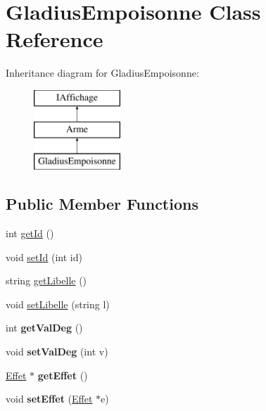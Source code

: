 \hypertarget{class_gladius_empoisonne}{\section{\-Gladius\-Empoisonne \-Class \-Reference}
\label{class_gladius_empoisonne}
}
\-Inheritance diagram for \-Gladius\-Empoisonne\-:\begin{figure}[H]
\begin{center}
\leavevmode
\includegraphics[height=3.000000cm]{class_gladius_empoisonne}
\end{center}
\end{figure}
\subsection*{\-Public \-Member \-Functions}
\begin{DoxyCompactItemize}
\item 
int \hyperlink{class_gladius_empoisonne_a23898d8572b5f9c552aec390cf474523}{get\-Id} ()
\item 
void \hyperlink{class_gladius_empoisonne_ac2dba19740e6b5e4c20bd2b783499682}{set\-Id} (int id)
\item 
string \hyperlink{class_gladius_empoisonne_a0db1471bda9bcd106c951ea5b1b9c7d5}{get\-Libelle} ()
\item 
void \hyperlink{class_gladius_empoisonne_af7260cdfc296aecb4433ccf9a5b18dc7}{set\-Libelle} (string l)
\item 
\hypertarget{class_gladius_empoisonne_abb1c37061e98b52d83d818c0a3c3065b}{int {\bfseries get\-Val\-Deg} ()}\label{class_gladius_empoisonne_abb1c37061e98b52d83d818c0a3c3065b}

\item 
\hypertarget{class_gladius_empoisonne_ab32eae0eafd4b365df10729b2a50367d}{void {\bfseries set\-Val\-Deg} (int v)}\label{class_gladius_empoisonne_ab32eae0eafd4b365df10729b2a50367d}

\item 
\hypertarget{class_gladius_empoisonne_af97519c3f19397455f0cf9eaa76b886d}{\hyperlink{class_effet}{\-Effet} $\ast$ {\bfseries get\-Effet} ()}\label{class_gladius_empoisonne_af97519c3f19397455f0cf9eaa76b886d}

\item 
\hypertarget{class_gladius_empoisonne_ab238f4b62f0ee6fa114db5167428dd3a}{void {\bfseries set\-Effet} (\hyperlink{class_effet}{\-Effet} $\ast$e)}\label{class_gladius_empoisonne_ab238f4b62f0ee6fa114db5167428dd3a}

\end{DoxyCompactItemize}


